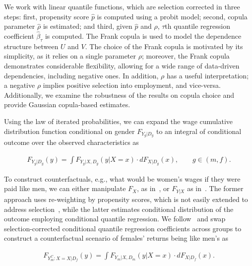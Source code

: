 We work with linear quantile functions, which are selection corrected in three steps: first, propensity score $\hat{p}$ is computed using a probit model; second, copula parameter $\hat{\rho}$ is estimated; and third, given $\hat{p}$ and $\hat{\rho}$, $\tau$th quantile regression coefficient $\hat{\beta}_{\tau}$ is computed. The Frank copula is used to model the dependence structure between $U$ and $V$. The choice of the Frank copula is motivated by its simplicity, as it relies on a single parameter $\rho$; moreover, the Frank copula demonstrates considerable flexibility, allowing for a wide range of data-driven dependencies, including negative ones. In addition, $\rho$ has a useful interpretation; a negative $\rho$ implies positive selection into employment, and vice-versa.  Additionally, we examine the robustness of the results on copula choice and provide Gaussian copula-based estimates.\par 

Using the law of iterated probabilities, we can expand the wage cumulative distribution function conditional on gender $F_{Y_{g}|D_{g}}$ to an integral of conditional outcome over the observed characteristics as
\begin{linenomath*}\begin{align}
	F_{Y_{g}|D_{g}}(y) = \int F_{Y_{g}|X,D_{g}}(y|X=x)\cdot dF_{X|D_{g}}(x), \hspace{2em} g\in (m,f). 
\end{align}\end{linenomath*}
To construct counterfactuals, e.g., what would be women's wages if they were paid like men, we can either manipulate $F_{X}$, as in~\citet{DiNardo1996}, or $F_{Y|X}$ as in~\citet{Chernozhukov2013}. The former approach uses re-weighting by propensity scores, which is not easily extended to address selection~\citep{Maasoumi2017}, while the latter estimates conditional distribution of the outcome employing conditional quantile regression. We follow~\citet{Chernozhukov2013} and swap selection-corrected conditional quantile regression coefficients across groups to construct a counterfactual scenario of females' returns being like men's as 
\begin{linenomath*}\begin{align}
	F_{Y_{m}^{C}:X=X|D_{f}}(y) = \int F_{Y_{m}|X,D_{m}}(y|X=x)\cdot dF_{X|D_{f}}(x).
\end{align}\end{linenomath*}

